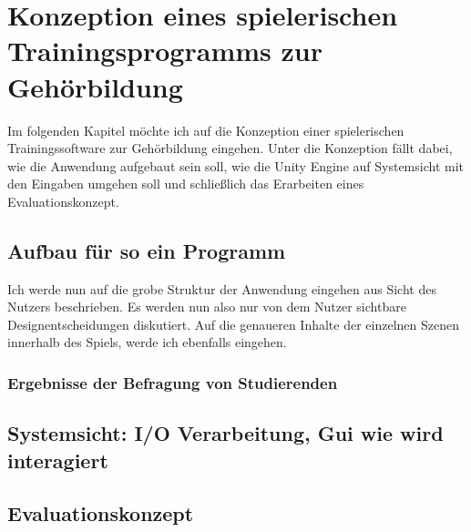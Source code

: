 \chapter{Konzeption eines spielerischen Trainingsprogramms zur Gehörbildung}


Im folgenden Kapitel möchte ich auf die Konzeption einer spielerischen Trainingssoftware zur Gehörbildung eingehen. Unter die Konzeption fällt dabei, wie die Anwendung aufgebaut sein soll, wie die Unity Engine auf Systemsicht mit den 
Eingaben umgehen soll und schließlich das Erarbeiten eines Evaluationskonzept.


\section{Aufbau für so ein Programm}
%

Ich werde nun auf die grobe Struktur der Anwendung eingehen aus Sicht des Nutzers beschrieben. Es werden nun also nur von dem Nutzer sichtbare Designentscheidungen diskutiert. Auf die genaueren Inhalte der einzelnen Szenen innerhalb 
des Spiels, werde ich ebenfalls eingehen.

\subsection*{Ergebnisse der Befragung von Studierenden}
%

\section{Systemsicht: I/O Verarbeitung, Gui wie wird interagiert}
% 
%

\section{Evaluationskonzept}
    
